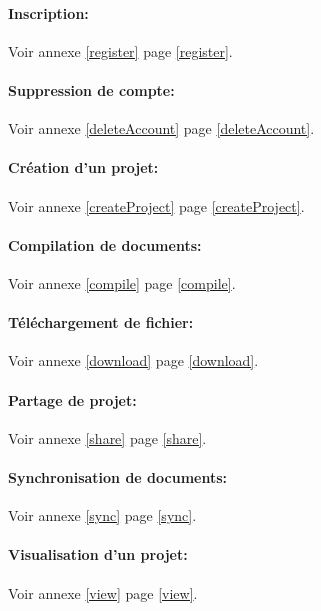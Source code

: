 \documentclass[a4paper,12pt]{article}
\begin{document}
\paragraph{Inscription:\\}
Voir annexe \ref{register} page \ref{register}.

\paragraph{Suppression de compte:\\}
Voir annexe \ref{deleteAccount} page \ref{deleteAccount}.

\paragraph{Création d'un projet:\\}
Voir annexe \ref{createProject} page \ref{createProject}.

\paragraph{Compilation de documents:\\}
Voir annexe \ref{compile} page \ref{compile}.

\paragraph{Téléchargement de fichier:\\}
Voir annexe \ref{download} page \ref{download}.

\paragraph{Partage de projet:\\}
Voir annexe \ref{share} page \ref{share}.

\paragraph{Synchronisation de documents:\\}
Voir annexe \ref{sync} page \ref{sync}.

\paragraph{Visualisation d'un projet:\\}
Voir annexe \ref{view} page \ref{view}.
\end{document}
